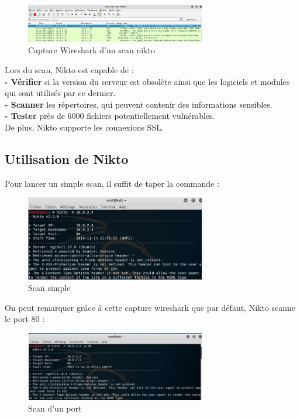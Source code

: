 \begin{figure}[htp!]
  \centering
  \setlength\figureheight{7cm}
  \setlength\figurewidth{9cm}
  \includegraphics[width=0.7\textwidth]{oui/Ancien/imangeancien/Nikto/wireshark1.PNG}
  \caption{Capture Wireshark d'un scan nikto}
  \label{fig:niktowire}
\end{figure}


\noindent Lors du scan, Nikto est capable de :\\
\textbf{- Vérifier} si la version du serveur est obsolète ainsi que les logiciels et     modules qui sont utilisés par ce dernier. \\   
\textbf{- Scanner} les répertoires, qui peuvent contenir des informations sensibles.\\
\textbf{- Tester} près de 6000 fichiers potentiellement vulnérables.\\
De plus, Nikto supporte les connexions SSL.


\newpage

\subsection{Utilisation de Nikto}

\noindent Pour lancer un simple scan, il suffit de taper la commande :

\begin{figure}[htp!]
  \centering
  \setlength\figureheight{7cm}
  \setlength\figurewidth{9cm}
  \includegraphics[width=0.7\textwidth]{oui/Ancien/imangeancien/Nikto/1.PNG}
  \caption{Scan simple}
  \label{fig:courbe-tikz}
\end{figure}

On peut remarquer grâce à cette capture wireshark que par défaut, Nikto scanne le port 80 :

\begin{figure}[htp!]
  \centering
  \setlength\figureheight{7cm}
  \setlength\figurewidth{9cm}
  \includegraphics[width=0.7\textwidth]{oui/Ancien/imangeancien/Nikto/2.PNG}
  \caption{Scan d'un port}
  \label{fig:courbe-tikz}
\end{figure}

